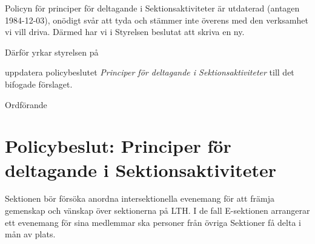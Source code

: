 \documentclass[../_main/handlingar.tex]{subfiles}
\begin{document}
Policyn för principer för deltagande i Sektionsaktiviteter är utdaterad (antagen 1984-12-03), onödigt svår att tyda och stämmer inte överens med den verksamhet vi vill driva. Därmed har vi i Styrelsen beslutat att skriva en ny.

Därför yrkar styrelsen på

\begin{attsatser}
    \att uppdatera policybeslutet \emph{Principer för deltagande i Sektionsaktiviteter} till det bifogade förslaget.
\end{attsatser}

\begin{signatures}{1}
    \ist
    \signature{\ordf}{Ordförande}
\end{signatures}

\newpage
\section*{Policybeslut: Principer för deltagande i Sektionsaktiviteter}
Sektionen bör försöka anordna intersektionella evenemang för att främja gemenskap och vänskap över sektionerna på LTH. I de fall E-sektionen arrangerar ett evenemang för sina medlemmar ska personer från övriga Sektioner få delta i mån av plats.
\newpage
\end{document}
